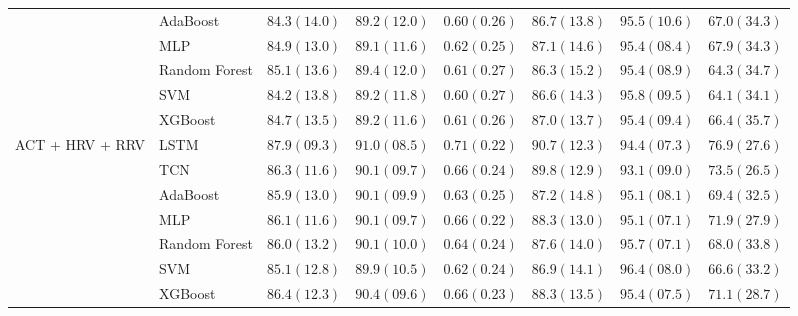 \begin{tabular}{llllllll}
 & AdaBoost & $84.3 (14.0)$ & $89.2 (12.0)$ & $0.60 (0.26)$ & $86.7 (13.8)$ & $95.5 (10.6)$ & $67.0 (34.3)$ \\
 & MLP & $84.9 (13.0)$ & $89.1 (11.6)$ & $0.62 (0.25)$ & $87.1 (14.6)$ & $95.4 (08.4)$ & $67.9 (34.3)$ \\
 & Random Forest & $85.1 (13.6)$ & $89.4 (12.0)$ & $0.61 (0.27)$ & $86.3 (15.2)$ & $95.4 (08.9)$ & $64.3 (34.7)$ \\
 & SVM & $84.2 (13.8)$ & $89.2 (11.8)$ & $0.60 (0.27)$ & $86.6 (14.3)$ & $95.8 (09.5)$ & $64.1 (34.1)$ \\
 & XGBoost & $84.7 (13.5)$ & $89.2 (11.6)$ & $0.61 (0.26)$ & $87.0 (13.7)$ & $95.4 (09.4)$ & $66.4 (35.7)$ \\
\multirow[c]{7}{*}{ACT + HRV + RRV} & LSTM & $87.9 (09.3)$ & $91.0 (08.5)$ & $0.71 (0.22)$ & $90.7 (12.3)$ & $94.4 (07.3)$ & $76.9 (27.6)$ \\
 & TCN & $86.3 (11.6)$ & $90.1 (09.7)$ & $0.66 (0.24)$ & $89.8 (12.9)$ & $93.1 (09.0)$ & $73.5 (26.5)$ \\
 & AdaBoost & $85.9 (13.0)$ & $90.1 (09.9)$ & $0.63 (0.25)$ & $87.2 (14.8)$ & $95.1 (08.1)$ & $69.4 (32.5)$ \\
 & MLP & $86.1 (11.6)$ & $90.1 (09.7)$ & $0.66 (0.22)$ & $88.3 (13.0)$ & $95.1 (07.1)$ & $71.9 (27.9)$ \\
 & Random Forest & $86.0 (13.2)$ & $90.1 (10.0)$ & $0.64 (0.24)$ & $87.6 (14.0)$ & $95.7 (07.1)$ & $68.0 (33.8)$ \\
 & SVM & $85.1 (12.8)$ & $89.9 (10.5)$ & $0.62 (0.24)$ & $86.9 (14.1)$ & $96.4 (08.0)$ & $66.6 (33.2)$ \\
 & XGBoost & $86.4 (12.3)$ & $90.4 (09.6)$ & $0.66 (0.23)$ & $88.3 (13.5)$ & $95.4 (07.5)$ & $71.1 (28.7)$ \\
\end{tabular}
